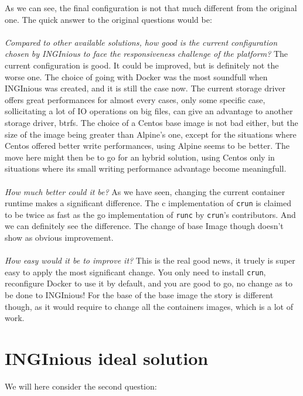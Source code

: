 As we can see, the final configuration is not that much different from the original one.  The quick answer to the original questions would be:
\paragraph{}\textit{Compared to other available solutions, how good is the current configuration chosen by INGInious to face the responsiveness challenge of the platform?}  The current configuration is good.  It could be improved, but is definitely not the worse one.  The choice of going with Docker was the most soundfull when INGInious was created, and it is still the case now.  The current storage driver offers great performances for almost every cases, only some specific case, sollicitating a lot of IO operations on big files, can give an advantage to another storage driver, btrfs.  The choice of a Centos base image is not bad either, but the size of the image being greater than Alpine's one, except for the situations where Centos offered better write performances, using Alpine seems to be better.  The move here might then be to go for an hybrid solution, using Centos only in situations where its small writing performance advantage become meaningfull.  
\paragraph{}\textit{How much better could it be?}  As we have seen, changing the current container runtime makes a significant difference.  The c implementation of \texttt{crun} is claimed to be twice as fast as the go implementation of \texttt{runc} by \texttt{crun}'s contributors.  And we can definitely see the difference.  The change of base Image though doesn't show as obvious improvement.
\paragraph{}\textit{How easy would it be to improve it?}  This is the real good news, it truely is super easy to apply the most significant change.  You only need to install \texttt{crun}, reconfigure Docker to use it by default, and you are good to go, no change as to be done to INGInious!  For the base of the base image the story is different though, as it would require to change all the containers images, which is a lot of work.

\section{INGInious ideal solution}
We will here consider the second question:
\begin{center}
\end{center}

